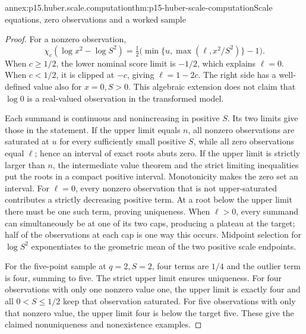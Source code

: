 \begin{annexitem}{annex:p15.huber.scale.computation}{thm:p15-huber-scale-computation}{Scale equations, zero observations and a worked sample}
\begin{proof}
For a nonzero observation,
\[
 \chi_c(\log x^2-\log S^2)
 =\tfrac12\bigl(\min\{u,\max(\ell,x^2/S^2)\}-1\bigr).
\]
When \(c\geq1/2\), the lower nominal score limit is \(-1/2\),
which explains \(\ell=0\). When \(c<1/2\), it is clipped at
\(-c\), giving \(\ell=1-2c\).
The right side has a well-defined value also for \(x=0,S>0\).
This algebraic extension does not claim that \(\log0\) is a
real-valued observation in the transformed model.

Each summand is continuous and nonincreasing in positive \(S\).
Its two limits give those in the statement. If the upper limit
equals \(n\), all nonzero observations are saturated at \(u\)
for every sufficiently small positive \(S\), while all zero
observations equal \(\ell\); hence an interval of exact roots
abuts zero. If the upper limit is strictly larger than \(n\),
the intermediate value theorem and the strict limiting inequalities
put the roots in a compact positive interval. Monotonicity makes
the zero set an interval. For \(\ell=0\), every nonzero observation
that is not upper-saturated contributes a strictly decreasing
positive term. At a root below the upper limit there must be
one such term, proving uniqueness.
When \(\ell>0\), every summand can simultaneously be at one
of its two caps, producing a plateau at the target; half of the
observations at each cap is one way this occurs.
Midpoint selection for \(\log S^2\) exponentiates to the geometric
mean of the two positive scale endpoints.

For the five-point sample at \(q=2,S=2\), four terms are \(1/4\)
and the outlier term is four, summing to five. The strict upper
limit ensures uniqueness. For four observations with only one
nonzero value one, the upper limit is exactly four and all
\(0<S\leq1/2\) keep that observation saturated.
For five observations with only that nonzero value, the upper
limit four is below the target five. These give the claimed
nonuniqueness and nonexistence examples.
\end{proof}
\end{annexitem}

